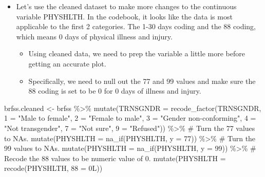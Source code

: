 \documentclass[
  letterpaper,
  DIV=11,
  numbers=noendperiod]{scrreprt}
\newenvironment{Shaded}{\begin{snugshade}}{\end{snugshade}}
\newcommand{\AttributeTok}[1]{\textcolor[rgb]{0.40,0.45,0.13}{#1}}
\newcommand{\CommentTok}[1]{\textcolor[rgb]{0.37,0.37,0.37}{#1}}
\newcommand{\DecValTok}[1]{\textcolor[rgb]{0.68,0.00,0.00}{#1}}
\newcommand{\FunctionTok}[1]{\textcolor[rgb]{0.28,0.35,0.67}{#1}}
\newcommand{\NormalTok}[1]{\textcolor[rgb]{0.00,0.23,0.31}{#1}}
\newcommand{\OtherTok}[1]{\textcolor[rgb]{0.00,0.23,0.31}{#1}}
\newcommand{\SpecialCharTok}[1]{\textcolor[rgb]{0.37,0.37,0.37}{#1}}
\newcommand{\StringTok}[1]{\textcolor[rgb]{0.13,0.47,0.30}{#1}}
\providecommand{\tightlist}{%
  \setlength{\itemsep}{0pt}\setlength{\parskip}{0pt}}\usepackage{longtable,booktabs,array}
\begin{document}
\begin{itemize}
\tightlist
\item
  Let's use the cleaned dataset to make more changes to the continuous
  variable PHYSHLTH. In the codebook, it looks like the data is most
  applicable to the first 2 categories. The 1-30 days coding and the 88
  coding, which means 0 days of physical illness and injury.

  \begin{itemize}
  \tightlist
  \item
    Using cleaned data, we need to prep the variable a little more
    before getting an accurate plot.
  \item
    Specifically, we need to null out the 77 and 99 values and make sure
    the 88 coding is set to be 0 for 0 days of illness and injury.
  \end{itemize}
\end{itemize}

\begin{Shaded}
\begin{Highlighting}[]
\NormalTok{brfss.cleaned }\OtherTok{\textless{}{-}}\NormalTok{ brfss }\SpecialCharTok{\%\textgreater{}\%}
    \FunctionTok{mutate}\NormalTok{(}\AttributeTok{TRNSGNDR =} \FunctionTok{recode\_factor}\NormalTok{(TRNSGNDR, }\StringTok{\textasciigrave{}}\AttributeTok{1}\StringTok{\textasciigrave{}} \OtherTok{=} \StringTok{"Male to female"}\NormalTok{, }\StringTok{\textasciigrave{}}\AttributeTok{2}\StringTok{\textasciigrave{}} \OtherTok{=} \StringTok{"Female to male"}\NormalTok{,}
        \StringTok{\textasciigrave{}}\AttributeTok{3}\StringTok{\textasciigrave{}} \OtherTok{=} \StringTok{"Gender non{-}conforming"}\NormalTok{, }\StringTok{\textasciigrave{}}\AttributeTok{4}\StringTok{\textasciigrave{}} \OtherTok{=} \StringTok{"Not transgender"}\NormalTok{, }\StringTok{\textasciigrave{}}\AttributeTok{7}\StringTok{\textasciigrave{}} \OtherTok{=} \StringTok{"Not sure"}\NormalTok{,}
        \StringTok{\textasciigrave{}}\AttributeTok{9}\StringTok{\textasciigrave{}} \OtherTok{=} \StringTok{"Refused"}\NormalTok{)) }\SpecialCharTok{\%\textgreater{}\%}
    \CommentTok{\# Turn the 77 values to NA\textquotesingle{}s.}
\FunctionTok{mutate}\NormalTok{(}\AttributeTok{PHYSHLTH =} \FunctionTok{na\_if}\NormalTok{(PHYSHLTH, }\AttributeTok{y =} \DecValTok{77}\NormalTok{)) }\SpecialCharTok{\%\textgreater{}\%}
    \CommentTok{\# Turn the 99 values to NA\textquotesingle{}s.}
\FunctionTok{mutate}\NormalTok{(}\AttributeTok{PHYSHLTH =} \FunctionTok{na\_if}\NormalTok{(PHYSHLTH, }\AttributeTok{y =} \DecValTok{99}\NormalTok{)) }\SpecialCharTok{\%\textgreater{}\%}
    \CommentTok{\# Recode the 88 values to be numeric value of 0.}
\FunctionTok{mutate}\NormalTok{(}\AttributeTok{PHYSHLTH =} \FunctionTok{recode}\NormalTok{(PHYSHLTH, }\StringTok{\textasciigrave{}}\AttributeTok{88}\StringTok{\textasciigrave{}} \OtherTok{=} \DecValTok{0}\NormalTok{L))}
\end{Highlighting}
\end{Shaded}
\end{document}
